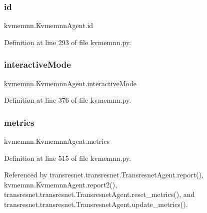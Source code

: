 \subsubsection{\texorpdfstring{id}{id}}
{\footnotesize\ttfamily kvmemnn.\+Kvmemnn\+Agent.\+id}



Definition at line 293 of file kvmemnn.\+py.

\mbox{\label{classkvmemnn_1_1KvmemnnAgent_aa5d6db7229e8767b9a41e85d17f4680e}} 
\subsubsection{\texorpdfstring{interactive\+Mode}{interactiveMode}}
{\footnotesize\ttfamily kvmemnn.\+Kvmemnn\+Agent.\+interactive\+Mode}



Definition at line 376 of file kvmemnn.\+py.

\mbox{\label{classkvmemnn_1_1KvmemnnAgent_ac8fb83cab866022a264be22fca627193}} 
\subsubsection{\texorpdfstring{metrics}{metrics}}
{\footnotesize\ttfamily kvmemnn.\+Kvmemnn\+Agent.\+metrics}



Definition at line 515 of file kvmemnn.\+py.



Referenced by transresnet.\+transresnet.\+Transresnet\+Agent.\+report(), kvmemnn.\+Kvmemnn\+Agent.\+report2(), transresnet.\+transresnet.\+Transresnet\+Agent.\+reset\+\_\+metrics(), and transresnet.\+transresnet.\+Transresnet\+Agent.\+update\+\_\+metrics().

\mbox{\label{classkvmemnn_1_1KvmemnnAgent_a49f09374ce57503c219e8e872527332e}} 
